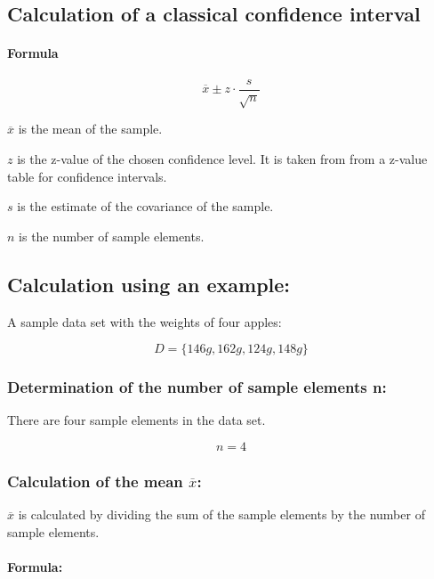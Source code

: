 \documentclass[a4paper,13pt,twoside]{book}
\begin{document}
\subsection{Calculation of a classical confidence interval}

\paragraph{Formula}

$$
\overline{x} \pm 
z \cdot
\frac{s}{\sqrt{n}}
$$

\textbf{$\overline{x}$} is the mean of the sample.

\textbf{$z$} is the z-value of the chosen confidence level. It is taken from from a z-value table for confidence intervals.

\textbf{$s$} is the estimate of the covariance of the sample.

\textbf{$n$} is the number of sample elements.



\subsection{Calculation using an example:}

A sample data set with the weights of four apples: 

$$D = \{146 g, 162 g, 124 g, 148 g\}$$



\subsubsection{Determination of the number of sample elements n:}

There are four sample elements in the data set.

$$
n = 4
$$



\subsubsection{Calculation of the mean $\overline{x}$:}

$\overline{x}$ is calculated by dividing the sum of the sample elements by the number of sample elements.

\paragraph{Formula:}
\end{document}
